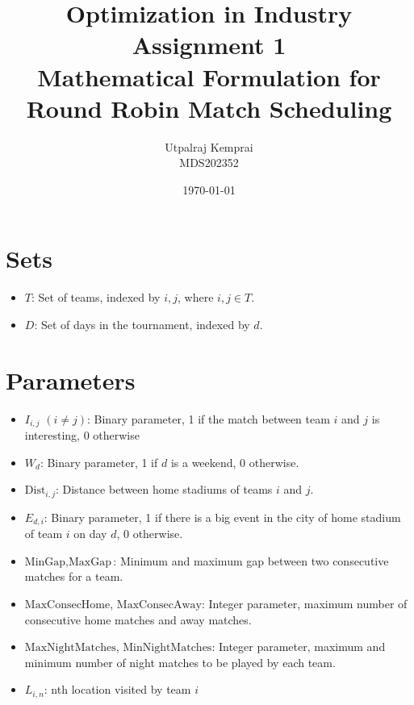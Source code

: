 \documentclass[a4paper, 12pt]{article}
\title{Optimization in Industry Assignment 1 \\ Mathematical Formulation for Round Robin Match Scheduling}
\author{Utpalraj Kemprai \\ MDS202352}
\date{\today}
\begin{document}
\maketitle

\section*{Sets}
\begin{itemize}
    \item $T$: Set of teams, indexed by $i, j$, where $i, j \in T$.
    \item $D$: Set of days in the tournament, indexed by $d$.
\end{itemize}

\section*{Parameters}
\begin{itemize}
    \item $I_{i,j}$ $(i \neq j)$: Binary parameter, 1 if the match between team $i$ and $j$ is interesting, 0 otherwise
    \item $W_{d}$: Binary parameter, 1 if $d$ is a weekend, 0 otherwise.
    \item $\text{Dist}_{i,j}$: Distance between home stadiums of teams $i$ and $j$.
    \item $E_{d,i}$: Binary parameter, 1 if there is a big event in the city of home stadium of team $i$ on day $d$, 0 otherwise.
    \item $\text{MinGap}, \text{MaxGap}$: Minimum and maximum gap between two consecutive matches for a team.
    \item $\text{MaxConsecHome}$, $\text{MaxConsecAway}$: Integer parameter, maximum number of consecutive home matches and away matches.
    \item $\text{MaxNightMatches}$, $\text{MinNightMatches}$: Integer parameter, maximum and minimum number of night matches to be played by each team.
    \item $L_{i,n}$: nth location visited by team $i$
\end{itemize}
\end{document}
